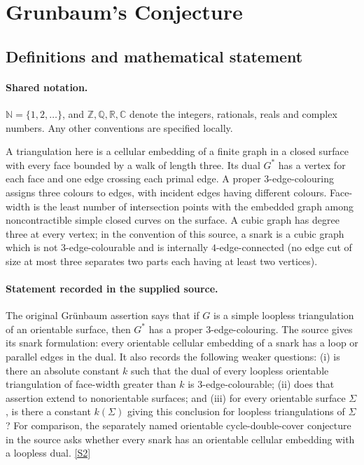 \documentclass[11pt]{article}
\newcommand{\sref}[2]{\hyperlink{source:#1:#2}{[S#2]}}
\begin{document}
\section{Grunbaum's Conjecture}\label{statement}

\subsection{Definitions and mathematical statement}

\paragraph{Shared notation.}$\mathbb N=\{1,2,\ldots\}$, and $\mathbb Z,\mathbb Q,\mathbb R,\mathbb C$ denote the integers, rationals, reals and complex numbers. Any other conventions are specified locally.


A triangulation here is a cellular embedding of a finite graph in a closed surface with every face bounded by a walk of length three. Its dual $G^*$ has a vertex for each face and one edge crossing each primal edge. A proper $3$-edge-colouring assigns three colours to edges, with incident edges having different colours. Face-width is the least number of intersection points with the embedded graph among noncontractible simple closed curves on the surface. A cubic graph has degree three at every vertex; in the convention of this source, a snark is a cubic graph which is not $3$-edge-colourable and is internally $4$-edge-connected (no edge cut of size at most three separates two parts each having at least two vertices).
\paragraph{Statement recorded in the supplied source.}
The original Grünbaum assertion says that if $G$ is a simple loopless triangulation of an orientable surface, then $G^*$ has a proper $3$-edge-colouring. The source gives its snark formulation: every orientable cellular embedding of a snark has a loop or parallel edges in the dual. It also records the following weaker questions: (i) is there an absolute constant $k$ such that the dual of every loopless orientable triangulation of face-width greater than $k$ is $3$-edge-colourable; (ii) does that assertion extend to nonorientable surfaces; and (iii) for every orientable surface $\Sigma$, is there a constant $k(\Sigma)$ giving this conclusion for loopless triangulations of $\Sigma$? For comparison, the separately named orientable cycle-double-cover conjecture in the source asks whether every snark has an orientable cellular embedding with a loopless dual. \sref{statement}{2}
\end{document}
